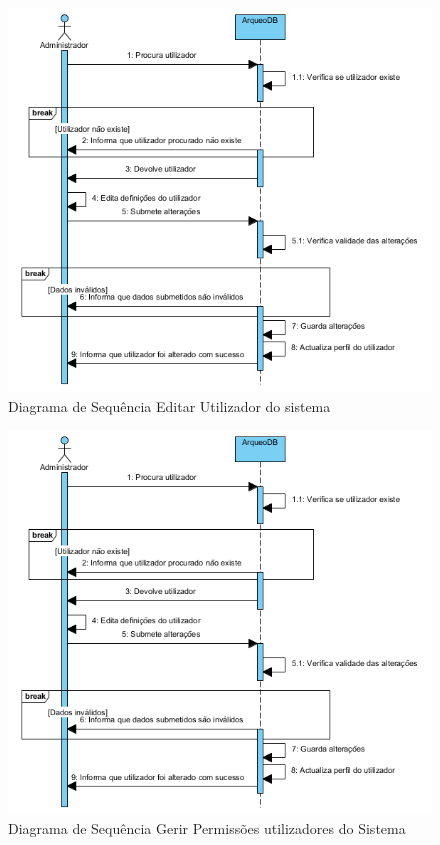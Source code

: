 ﻿\documentclass[12pt,a4paper]{article}
\begin{document}
\begin{figure}[h!]
\centering
\includegraphics[scale=1]{sequencia/A_editarutilizador}
\caption{Diagrama de Sequência Editar Utilizador do sistema} 
\end{figure}  

\begin{figure}[h!]
\centering
\includegraphics[scale=1]{sequencia/A_editarutilizador}
\caption{Diagrama de Sequência Gerir Permissões utilizadores do Sistema} 
\end{figure}   
  
\end{document}
